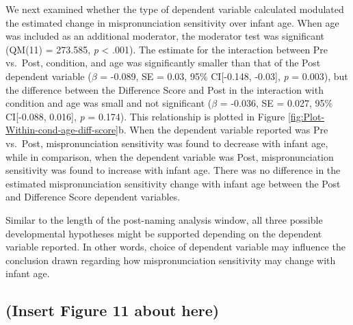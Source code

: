 \documentclass[man]{apa6}
\theoremstyle{definition}
\theoremstyle{definition}
\theoremstyle{definition}
\theoremstyle{remark}
\begin{document}
We next examined whether the type of dependent variable calculated
modulated the estimated change in mispronunciation sensitivity over
infant age. When age was included as an additional moderator, the
moderator test was significant (QM(11) = 273.585, \emph{p} \textless{}
.001). The estimate for the interaction between Pre vs.~Post, condition,
and age was significantly smaller than that of the Post dependent
variable (\(\beta\) = -0.089, SE = 0.03, 95\% CI{[}-0.148, -0.03{]},
\emph{p} = 0.003), but the difference between the Difference Score and
Post in the interaction with condition and age was small and not
significant (\(\beta\) = -0.036, SE = 0.027, 95\% CI{[}-0.088, 0.016{]},
\emph{p} = 0.174). This relationship is plotted in Figure
\ref{fig:Plot-Within-cond-age-diff-score}b. When the dependent variable
reported was Pre vs.~Post, mispronunciation sensitivity was found to
decrease with infant age, while in comparison, when the dependent
variable was Post, mispronunciation sensitivity was found to increase
with infant age. There was no difference in the estimated
mispronunciation sensitivity change with infant age between the Post and
Difference Score dependent variables.

Similar to the length of the post-naming analysis window, all three
possible developmental hypotheses might be supported depending on the
dependent variable reported. In other words, choice of dependent
variable may influence the conclusion drawn regarding how
mispronunciation sensitivity may change with infant age.

\subsection{(Insert Figure 11 about
here)}\label{insert-figure-11-about-here}
\end{document}
